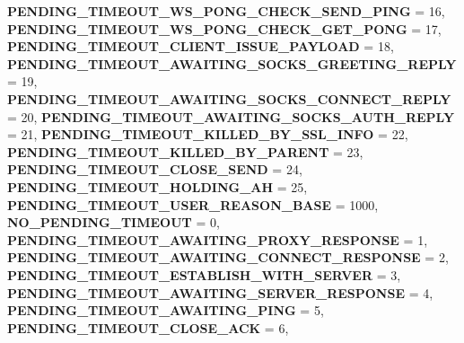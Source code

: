 \begin{DoxyCompactItemize}
{\bfseries P\+E\+N\+D\+I\+N\+G\+\_\+\+T\+I\+M\+E\+O\+U\+T\+\_\+\+W\+S\+\_\+\+P\+O\+N\+G\+\_\+\+C\+H\+E\+C\+K\+\_\+\+S\+E\+N\+D\+\_\+\+P\+I\+NG} = 16, 
\newline
{\bfseries P\+E\+N\+D\+I\+N\+G\+\_\+\+T\+I\+M\+E\+O\+U\+T\+\_\+\+W\+S\+\_\+\+P\+O\+N\+G\+\_\+\+C\+H\+E\+C\+K\+\_\+\+G\+E\+T\+\_\+\+P\+O\+NG} = 17, 
{\bfseries P\+E\+N\+D\+I\+N\+G\+\_\+\+T\+I\+M\+E\+O\+U\+T\+\_\+\+C\+L\+I\+E\+N\+T\+\_\+\+I\+S\+S\+U\+E\+\_\+\+P\+A\+Y\+L\+O\+AD} = 18, 
{\bfseries P\+E\+N\+D\+I\+N\+G\+\_\+\+T\+I\+M\+E\+O\+U\+T\+\_\+\+A\+W\+A\+I\+T\+I\+N\+G\+\_\+\+S\+O\+C\+K\+S\+\_\+\+G\+R\+E\+E\+T\+I\+N\+G\+\_\+\+R\+E\+P\+LY} = 19, 
{\bfseries P\+E\+N\+D\+I\+N\+G\+\_\+\+T\+I\+M\+E\+O\+U\+T\+\_\+\+A\+W\+A\+I\+T\+I\+N\+G\+\_\+\+S\+O\+C\+K\+S\+\_\+\+C\+O\+N\+N\+E\+C\+T\+\_\+\+R\+E\+P\+LY} = 20, 
\newline
{\bfseries P\+E\+N\+D\+I\+N\+G\+\_\+\+T\+I\+M\+E\+O\+U\+T\+\_\+\+A\+W\+A\+I\+T\+I\+N\+G\+\_\+\+S\+O\+C\+K\+S\+\_\+\+A\+U\+T\+H\+\_\+\+R\+E\+P\+LY} = 21, 
{\bfseries P\+E\+N\+D\+I\+N\+G\+\_\+\+T\+I\+M\+E\+O\+U\+T\+\_\+\+K\+I\+L\+L\+E\+D\+\_\+\+B\+Y\+\_\+\+S\+S\+L\+\_\+\+I\+N\+FO} = 22, 
{\bfseries P\+E\+N\+D\+I\+N\+G\+\_\+\+T\+I\+M\+E\+O\+U\+T\+\_\+\+K\+I\+L\+L\+E\+D\+\_\+\+B\+Y\+\_\+\+P\+A\+R\+E\+NT} = 23, 
{\bfseries P\+E\+N\+D\+I\+N\+G\+\_\+\+T\+I\+M\+E\+O\+U\+T\+\_\+\+C\+L\+O\+S\+E\+\_\+\+S\+E\+ND} = 24, 
\newline
{\bfseries P\+E\+N\+D\+I\+N\+G\+\_\+\+T\+I\+M\+E\+O\+U\+T\+\_\+\+H\+O\+L\+D\+I\+N\+G\+\_\+\+AH} = 25, 
{\bfseries P\+E\+N\+D\+I\+N\+G\+\_\+\+T\+I\+M\+E\+O\+U\+T\+\_\+\+U\+S\+E\+R\+\_\+\+R\+E\+A\+S\+O\+N\+\_\+\+B\+A\+SE} = 1000, 
{\bfseries N\+O\+\_\+\+P\+E\+N\+D\+I\+N\+G\+\_\+\+T\+I\+M\+E\+O\+UT} = 0, 
{\bfseries P\+E\+N\+D\+I\+N\+G\+\_\+\+T\+I\+M\+E\+O\+U\+T\+\_\+\+A\+W\+A\+I\+T\+I\+N\+G\+\_\+\+P\+R\+O\+X\+Y\+\_\+\+R\+E\+S\+P\+O\+N\+SE} = 1, 
\newline
{\bfseries P\+E\+N\+D\+I\+N\+G\+\_\+\+T\+I\+M\+E\+O\+U\+T\+\_\+\+A\+W\+A\+I\+T\+I\+N\+G\+\_\+\+C\+O\+N\+N\+E\+C\+T\+\_\+\+R\+E\+S\+P\+O\+N\+SE} = 2, 
{\bfseries P\+E\+N\+D\+I\+N\+G\+\_\+\+T\+I\+M\+E\+O\+U\+T\+\_\+\+E\+S\+T\+A\+B\+L\+I\+S\+H\+\_\+\+W\+I\+T\+H\+\_\+\+S\+E\+R\+V\+ER} = 3, 
{\bfseries P\+E\+N\+D\+I\+N\+G\+\_\+\+T\+I\+M\+E\+O\+U\+T\+\_\+\+A\+W\+A\+I\+T\+I\+N\+G\+\_\+\+S\+E\+R\+V\+E\+R\+\_\+\+R\+E\+S\+P\+O\+N\+SE} = 4, 
{\bfseries P\+E\+N\+D\+I\+N\+G\+\_\+\+T\+I\+M\+E\+O\+U\+T\+\_\+\+A\+W\+A\+I\+T\+I\+N\+G\+\_\+\+P\+I\+NG} = 5, 
\newline
{\bfseries P\+E\+N\+D\+I\+N\+G\+\_\+\+T\+I\+M\+E\+O\+U\+T\+\_\+\+C\+L\+O\+S\+E\+\_\+\+A\+CK} = 6, 

\end{DoxyCompactItemize}
